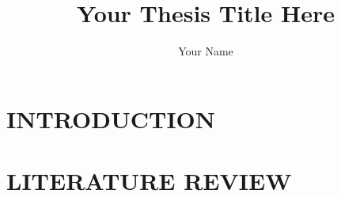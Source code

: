 \documentclass[a4paper]{template/hkustgz-thesis}
\title{Your Thesis Title Here}
\author{Your Name}
\begin{document}
\maketitle

\begin{abstract}

\end{abstract}


\makeauthorization

\makesignature

\begin{acknowledgments}

\end{acknowledgments}

\tableofcontents

\clearpage
{}
\listoffigures

\clearpage
{}
\listoftables

\mainmatter

\chapter{INTRODUCTION}
\label{chap:intro}


\chapter{LITERATURE REVIEW}
\label{chap:review}

\end{document}
